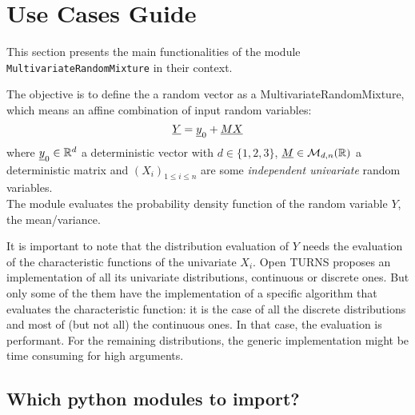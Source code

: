 



\section{Use Cases Guide}

This section presents the main functionalities of the module \texttt{MultivariateRandomMixture} in their context.


The objective is to define the a random vector as a MultivariateRandomMixture, which means an affine combination of input random variables:
$$
\displaystyle   {\underline{Y}}={\underline{y}}_0+{\underline{M}}{\underline{X}}
$$
where ${\underline{y}}_0\in\mathbb{R}^d$ a deterministic vector with  $d\in\{1,2,3\}$, ${\underline{M}}\in\mathcal{M}_{d,n}(\mathbb{R})$ a deterministic matrix
and $(X_i)_{ 1 \leq i \leq n}$ are some  \emph{independent univariate} random variables.\\


The module evaluates the probability density function of the random variable $Y$, the mean\slash variance.

It is important to note that the distribution evaluation of $Y$ needs the evaluation of the characteristic functions of the univariate $X_i$. 
Open TURNS proposes an implementation of all its univariate distributions, continuous or discrete ones. 
But only some of the them have the implementation of a specific algorithm that evaluates the characteristic function: 
it is the case of all the discrete distributions and most of (but not all) the continuous ones. 
In that case, the evaluation is performant. 
For the remaining distributions, the generic implementation might be time consuming for high arguments. \\


\subsection{Which python modules to import?}

